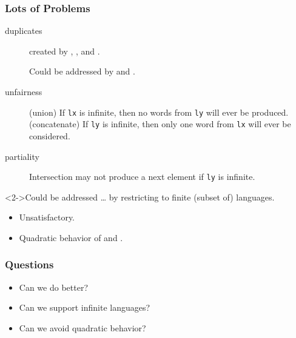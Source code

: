 \documentclass[pdftex,aspectratio=169]{beamer}
\begin{document}
\begin{frame}
  \frametitle{Lots of Problems}
  \begin{description}
  \item[duplicates] created by , , and .

    Could be addressed by  and .
  \item[unfairness] (union) If \texttt{lx} is infinite, then no words
    from \texttt{ly} will ever be produced.
    (concatenate) If \texttt{ly} is infinite, then only one word
    from \texttt{lx} will ever be considered.
  \item[partiality] Intersection may not produce a next element if \texttt{ly} is infinite.
  \end{description}
  \begin{block}<2->{Could be addressed \dots} by restricting to finite
    (subset of) languages.
    \begin{itemize}
    \item Unsatisfactory.
    \item 
      Quadratic behavior of  and .
  \end{itemize}
  \end{block}
\end{frame}

\begin{frame}
  \frametitle{Questions}
  \LARGE
  \begin{itemize}
  \item Can we do better?
  \item Can we support infinite languages?
  \item Can we avoid quadratic behavior?
  \end{itemize}
\end{frame}
\end{document}
